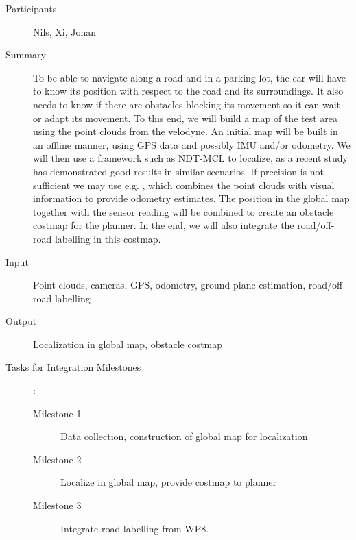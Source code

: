 \documentclass[11pt,a4paper]{article}
\begin{document}
\begin{description}
\item[Participants] Nils, Xi, Johan
\item[Summary] To be able to navigate along a road and in a parking lot, the car will have to know its 
			   position with respect to the road and its surroundings. It also needs to know if there
			   are obstacles blocking its movement so it can wait or adapt its movement.
			   To this end, we will build a map of the test area using the point clouds from the
			   velodyne. An initial map will be built in an offline manner, using GPS data and possibly
			   IMU and/or odometry. We will then use a framework such as NDT-MCL \cite{saarinen2013normal} 
			   to localize, as a recent study \cite{magnusson2015beyond} has demonstrated good results
			   in similar scenarios. If precision is not sufficient we may use e.g. \cite{Zhang_DEMO},
			   which combines the point clouds with visual information to provide odometry estimates.
			   The position in the global map together
			   with the sensor reading will be combined to create an obstacle costmap for the planner.
			   In the end, we will also integrate the road/off-road labelling in this costmap.
				
\item[Input] Point clouds, cameras, GPS, odometry, ground plane estimation, road/off-road labelling
\item[Output] Localization in global map, obstacle costmap
\item[Tasks for Integration Milestones]:\
	\begin{description}
		\item[Milestone 1] Data collection, construction of global map for localization
		\item[Milestone 2] Localize in global map, provide costmap to planner
		\item[Milestone 3] Integrate road labelling from WP8.
	\end{description}	 
\end{description}
\end{document}
